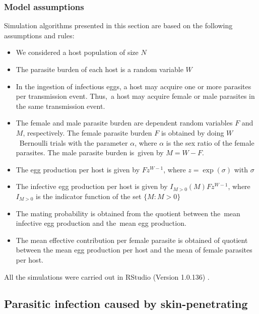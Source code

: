 \documentclass[12pt,a4paper]{article}
\theoremstyle{plain}%
\theoremstyle{definition}
\theoremstyle{remark}
\begin{document}
\subsubsection{Model assumptions}
Simulation algorithms presented in this section are based on
the following assumptions and rules:

\begin{itemize}
	\item We considered a host population of size $N$
	
	\item The parasite burden of each host is a random variable $W$
	
	\item In the ingestion of infectious eggs, a host may acquire one or more parasites per transmission event. Thus, a host may acquire female or male parasites in the same transmission event.
	
	\item The female and male parasite burden are dependent random variables $F$ and $M$, respectively. The female parasite burden $F$ is obtained by doing $W$ Bernoulli trials with the parameter $\alpha$, where $\alpha$ is the sex ratio of the female parasites. The male parasite burden is given by $M=W-F$.  
	
	\item The egg production per host is given by $Fz^{W-1}$, where $z=\exp(\sigma)$ with $\sigma$ 
	
	\item The infective egg production per host is given by $I_{M>0}(M)Fz^{W-1}$, where $I_{M>0}$ is the indicator function of the set $\{M:M>0\}$  
	
	\item The mating probability is obtained from the quotient between the mean infective egg production and the mean egg production.

	\item The mean effective contribution per female parasite is obtained of quotient between the mean egg production per host and the mean of female parasites per host. 

	
\end{itemize}

All the simulations were carried out in RStudio (Version 1.0.136) .

\subsection{Parasitic infection caused by skin-penetrating}
\end{document}
